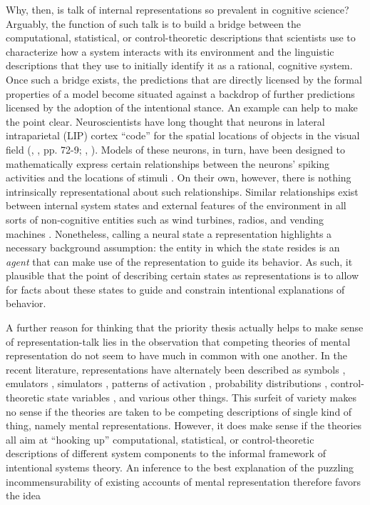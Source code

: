 Why, then, is talk of internal representations so prevalent in cognitive science? Arguably, the function of such talk is to build a bridge between the computational, statistical, or control-theoretic descriptions that scientists use to characterize how a system interacts with its environment and the linguistic descriptions that they use to initially identify it as a rational, cognitive system. Once such a bridge exists, the predictions that are directly licensed by the formal properties of a model become situated against a backdrop of further predictions licensed by the adoption of the intentional stance. An example can help to make the point clear. Neuroscientists have long thought that neurons in lateral intraparietal (LIP) cortex ``code'' for the spatial locations of objects in the visual field (\citeauthor{EliasmithAnderson:2003}, \citeyear{EliasmithAnderson:2003}, pp. 72-9; \citeauthor{Andersen:1985}, \citeyear{Andersen:1985}). Models of these neurons, in turn, have been designed to mathematically express certain relationships between the neurons' spiking activities and the locations of stimuli \citep{EliasmithAnderson:2003}. On their own, however, there is nothing intrinsically representational about such relationships. Similar relationships exist between internal system states and external features of the environment in all sorts of non-cognitive entities such as wind turbines, radios, and vending machines \citep{Dennett:1987}. Nonetheless, calling a neural state a representation highlights a necessary background assumption: the entity in which the state resides is an \textit{agent} that can make use of the representation to guide its behavior. As such, it plausible that the point of describing certain states as representations is to allow for facts about these states to guide and constrain intentional explanations of behavior. 

A further reason for thinking that the priority thesis actually helps to make sense of representation-talk lies in the observation that competing theories of mental representation do not seem to have much in common with one another. In the recent literature, representations have alternately been described as symbols \citep{Fodor:1998}, emulators \citep{Grush:2004}, simulators \citep{Barsalou:1999}, patterns of activation \citep{McClelland:2010}, probability distributions \citep{Goodman:2015}, control-theoretic state variables \citep{Eliasmith:2003,Eliasmith:2013}, and various other things. This surfeit of variety makes no sense if the theories are taken to be competing descriptions of single kind of thing, namely mental representations. However, it does make sense if the theories all aim at ``hooking up'' computational, statistical, or control-theoretic descriptions of different system components to the informal framework of intentional systems theory. An inference to the best explanation of the puzzling incommensurability of existing accounts of mental representation therefore favors the idea 

